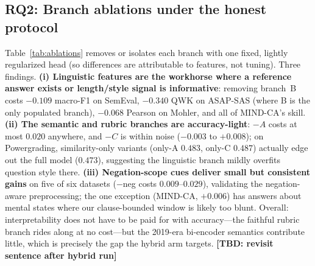 \documentclass[11pt]{article}
\newcommand{\TBD}[1]{\textbf{[TBD: #1]}}
\begin{document}
\subsection{RQ2: Branch ablations under the honest protocol}
\label{sec:results-ablation}

Table~\ref{tab:ablations} removes or isolates each branch with one fixed,
lightly regularized head (so differences are attributable to features, not
tuning). Three findings. \textbf{(i) Linguistic features are the workhorse
where a reference answer exists or length/style signal is informative}:
removing branch~B costs $-0.109$ macro-F1 on SemEval, $-0.340$ QWK on ASAP-SAS
(where B is the only populated branch), $-0.068$ Pearson on Mohler, and all of
MIND-CA's skill. \textbf{(ii) The semantic and rubric branches are
accuracy-light}: $-A$ costs at most $0.020$ anywhere, and $-C$ is within noise
($-0.003$ to $+0.008$); on Powergrading, similarity-only variants
(only-A $0.483$, only-C $0.487$) actually edge out the full model ($0.473$),
suggesting the linguistic branch mildly overfits question style there.
\textbf{(iii) Negation-scope cues deliver small but consistent gains} on five
of six datasets ($-$neg costs $0.009$--$0.029$), validating the
negation-aware preprocessing; the one exception (MIND-CA, $+0.006$) has
answers about mental states where our clause-bounded window is likely too
blunt. Overall: interpretability does not have to be paid for with
accuracy---the faithful rubric branch rides along at no cost---but the
2019-era bi-encoder semantics contribute little, which is precisely the gap
the hybrid arm targets. \TBD{revisit sentence after hybrid run}
\end{document}
